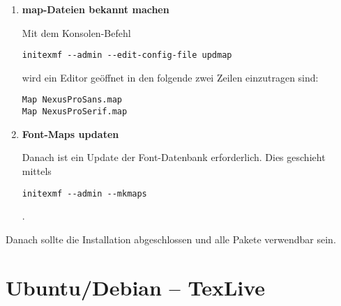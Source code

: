 \begin{description}
\begin{enumerate}
      \item {\bfseries map-Dateien bekannt machen}

      Mit dem Konsolen-Befehl
      \begin{lstlisting}[style=cmd]
initexmf --admin --edit-config-file updmap
      \end{lstlisting}
      wird ein Editor geöffnet in den folgende zwei Zeilen einzutragen sind:

      \begin{lstlisting}[style=file]
Map NexusProSans.map
Map NexusProSerif.map
      \end{lstlisting}

      \item {\bfseries Font-Maps updaten}

        Danach ist ein Update der Font-Datenbank erforderlich. Dies geschieht
        mittels
        \begin{lstlisting}[style=cmd]
initexmf --admin --mkmaps
        \end{lstlisting}
        .

    \end{enumerate}

    Danach sollte die Installation abgeschlossen und alle Pakete verwendbar 
    sein.
\end{description}


\clearpage
\section{Ubuntu/Debian -- TexLive}

